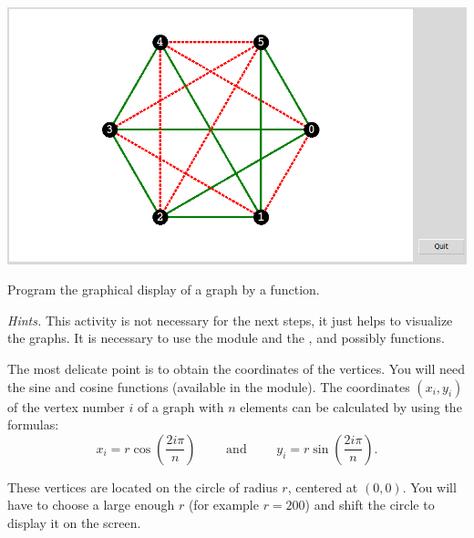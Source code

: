 \documentclass[11pt,class=report,crop=false]{standalone}
\begin{document}
\begin{activite}


\begin{center}
\includegraphics[scale=\myscale,scale=0.4]{screen-ramsey-2-en}
\end{center}


Program the graphical display of a graph by a  function.
     
\bigskip
     
\emph{Hints.} This activity is not necessary for the next steps, it just helps to visualize the graphs. It is necessary to use the  module and the ,  and possibly  functions. 

The most delicate point is to obtain the coordinates of the vertices. You will need the sine and cosine functions (available in the  module).
The coordinates $(x_i,y_i)$ of the vertex number $i$ of a graph with $n$ elements can be calculated by using the formulas:
$$x_i = r \cos\left(\frac{2 i \pi}{n}\right) \qquad \text{ and } \qquad y_i = r\sin\left(\frac{2 i \pi}{n}\right).$$

These vertices are located on the circle of radius $r$, centered at $(0,0)$. 
You will have to choose a large enough $r$ (for example $r=200$) and shift the circle to display it on the screen.


\end{activite}

\end{document}
